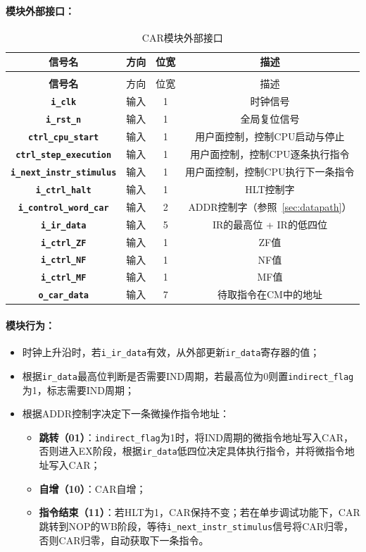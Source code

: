 \documentclass[lang=cn,a4paper,newtx]{elegantpaper}
\begin{document}
\paragraph{模块外部接口：}
\begin{longtable}{>{\bfseries}c c c c}
  \caption{CAR模块外部接口} \\
  \toprule
  信号名 & 方向 & 位宽 & 描述 \\
  \midrule
  \endfirsthead

  \multicolumn{4}{l}{\textbf{（续表）Control Memory模块外部接口}} \\
  \toprule
  信号名 & 方向 & 位宽 & 描述 \\
  \midrule
  \endhead
  \texttt{i\_clk}  & 输入 & 1& 时钟信号\\
  \texttt{i\_rst\_n}  & 输入 &1 & 全局复位信号 \\
  \texttt{ctrl\_cpu\_start}     & 输入 & 1 & 用户面控制，控制CPU启动与停止 \\
  \texttt{ctrl\_step\_execution} & 输入 & 1 & 用户面控制，控制CPU逐条执行指令 \\
  \texttt{i\_next\_instr\_stimulus}  & 输入 & 1 & 用户面控制，控制CPU执行下一条指令\\
  \texttt{i\_ctrl\_halt} & 输入 & 1 & HLT控制字 \\
  \texttt{i\_control\_word\_car} & 输入 & 2 & ADDR控制字（参照~\ref{sec:datapath}）\\
  \texttt{i\_ir\_data}  & 输入 & 5 & IR的最高位 + IR的低四位 \\
  \texttt{i\_ctrl\_ZF}  & 输入 & 1 & ZF值 \\
  \texttt{i\_ctrl\_NF}  & 输入 & 1 & NF值 \\
  \texttt{i\_ctrl\_MF}  & 输入 & 1 & MF值 \\
  \texttt{o\_car\_data} & 输入 & 7 & 待取指令在CM中的地址 \\
  \bottomrule
\end{longtable}
\paragraph{模块行为：}
\begin{itemize}
  \item 时钟上升沿时，若\texttt{i\_ir\_data}有效，从外部更新\texttt{ir\_data}寄存器的值；
  \item 根据\texttt{ir\_data}最高位判断是否需要IND周期，若最高位为0则置\texttt{indirect\_flag}为1，标志需要IND周期；
  \item 根据ADDR控制字决定下一条微操作指令地址：
  \begin{itemize}
    \item \textbf{跳转（01）}：\texttt{indirect\_flag}为1时，将IND周期的微指令地址写入CAR，否则进入EX阶段，根据\texttt{ir\_data}低四位决定具体执行指令，并将微指令地址写入CAR；
    \item \textbf{自增（10）}：CAR自增；
    \item \textbf{指令结束（11）}：若HLT为1，CAR保持不变；若在单步调试功能下，CAR跳转到NOP的WB阶段，等待\texttt{i\_next\_instr\_stimulus}信号将CAR归零，否则CAR归零，自动获取下一条指令。
  \end{itemize}
\end{itemize}
\end{document}
